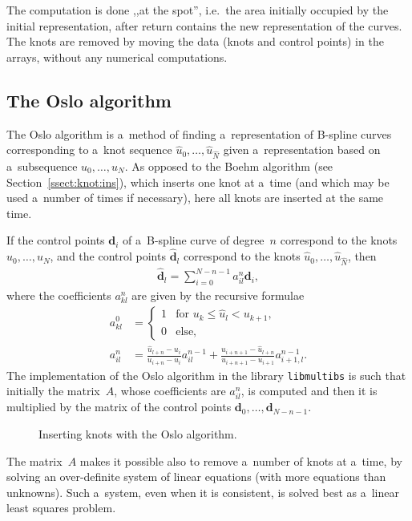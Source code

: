 The computation is done ,,at the spot'', i.e.\ the area initially occupied
by the initial representation, after return contains the new representation
of the curves. The knots are removed by moving the data (knots and control
points) in the arrays, without any
numerical computations.


\subsection{The Oslo algorithm}

The Oslo algorithm is a~method of finding a~representation of B-spline curves
corresponding to a~knot sequence $\hat{u}_0,\ldots,\hat{u}_{\hat{N}}$
given a~representation based on a~subsequence $u_0,\ldots,u_N$.
As opposed to the Boehm algorithm (see Section~\ref{ssect:knot:ins}),
which inserts one knot at a~time (and which may be used a~number of times
if necessary), here all knots are inserted at the same time.

If the control points $\bm{d}_i$ of a~B-spline curve of degree~$n$
correspond to the knots $u_0,\ldots,\allowbreak u_N$, and the control points
$\hat{\bm{d}}_l$ correspond to the knots
$\hat{u}_0,\ldots,\hat{u}_{\hat{N}}$, then
\begin{align}
  \hat{\bm{d}}_l = \sum_{i=0}^{N-n-1}a_{il}^n\bm{d}_i,
\end{align}
where the coefficients $a^{n}_{kl}$ are given by the recursive
formulae
\begin{align}\label{eq:Oslo:0}
  a^0_{kl} &{}= \left\{\begin{array}{ll}1 & \mbox{for $u_k\leq \hat{u}_l<u_{k+1}$,} \\
    0 & \mbox{else,} \end{array}\right. \\
  \label{eq:Oslo:j}
  a^n_{il} &{}= \frac{\hat{u}_{l+n}-u_i}{u_{i+n}-u_i} a^{n-1}_{il} +
    \frac{u_{i+n+1}-\hat{u}_{l+n}}{u_{i+n+1}-u_{i+1}} a^{n-1}_{i+1,l}.
\end{align}
The implementation of the Oslo algorithm in the library \texttt{libmultibs}
is such that initially the matrix~$A$, whose coefficients are
$a^n_{il}$, is computed and then it is multiplied by the matrix of the
control points $\bm{d}_0,\ldots,\bm{d}_{N-n-1}$.
\begin{figure}[htb]
  \centerline{}
  \caption{Inserting knots with the Oslo algorithm.}
\end{figure}

The matrix~$A$ makes it possible also to remove a~number of knots at
a~time, by solving an over-definite system of linear equations
(with more equations than unknowns).
Such a~system, even when it is consistent, is solved best as a~linear least
squares problem.

